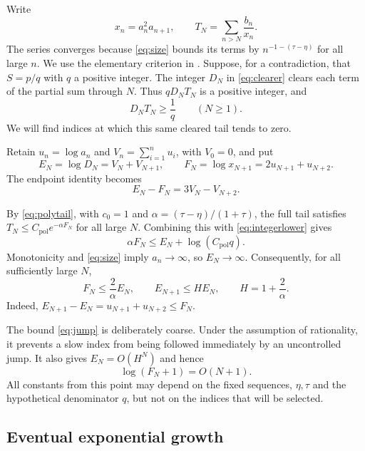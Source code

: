\documentclass[11pt]{article}
\numberwithin{equation}{section}
\begin{document}
Write
\[
  x_n=a_n^2a_{n+1},\qquad
  T_N=\sum_{n>N}\frac{b_n}{x_n}.
\]
The series converges because \eqref{eq:size} bounds its terms by
$n^{-1-(\tau-\eta)}$ for all large $n$.
We use the elementary criterion in \cite[Lemma~8]{BKKKZ}.
Suppose, for a contradiction, that $S=p/q$ with $q$ a positive integer.
The integer $D_N$ in \eqref{eq:clearer} clears each term of the partial
sum through $N$. Thus $qD_NT_N$ is a positive integer, and
\begin{equation}\label{eq:integerlower}
  D_NT_N\ge\frac1q\qquad(N\ge1).
\end{equation}
We will find indices at which this same cleared tail tends to zero.

Retain $u_n=\log a_n$ and $V_n=\sum_{i=1}^n u_i$, with $V_0=0$, and put
\begin{equation}\label{eq:EF}
  E_N=\log D_N=V_N+V_{N+1},\qquad
  F_N=\log x_{N+1}=2u_{N+1}+u_{N+2}.
\end{equation}
The endpoint identity becomes
\begin{equation}\label{eq:EFidentity}
  E_N-F_N=3V_N-V_{N+2}.
\end{equation}

By \eqref{eq:polytail}, with $c_0=1$ and
$\alpha=(\tau-\eta)/(1+\tau)$, the full tail satisfies
$T_N\le C_{\mathrm{pol}}e^{-\alpha F_N}$ for all large $N$.
Combining this with \eqref{eq:integerlower} gives
\[
  \alpha F_N\le E_N+\log(C_{\mathrm{pol}}q).
\]
Monotonicity and \eqref{eq:size} imply $a_n\to\infty$, so $E_N\to\infty$.
Consequently, for all sufficiently large $N$,
\begin{equation}\label{eq:jump}
  F_N\le\frac{2}{\alpha}E_N,\qquad
  E_{N+1}\le H E_N,\qquad H=1+\frac{2}{\alpha}.
\end{equation}
Indeed, $E_{N+1}-E_N=u_{N+1}+u_{N+2}\le F_N$.

The bound \eqref{eq:jump} is deliberately coarse. Under the assumption
of rationality, it prevents a slow index from being followed immediately
by an uncontrolled jump. It also gives $E_N=O(H^N)$ and hence
\begin{equation}\label{eq:logF}
  \log(F_N+1)=O(N+1).
\end{equation}
All constants from this point may depend on the fixed sequences,
$\eta,\tau$ and the hypothetical denominator $q$, but not on the
indices that will be selected.

\subsection{Eventual exponential growth}
\end{document}
